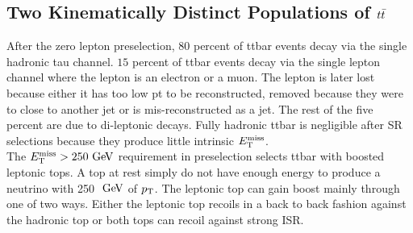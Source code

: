 \subsection{Two Kinematically Distinct Populations of $t\bar{t}$}
\label{sec:Bkg:ttbar:Pop}

\indent After the zero lepton preselection, 80 percent of ttbar events decay via the single hadronic tau channel.  $15$ percent of ttbar events decay via the single lepton channel where the lepton is an electron or a muon.  The lepton is later lost because either it has too low pt to be reconstructed, removed because they were to close to another jet or is mis-reconstructed as a jet. The rest of the five percent are due to di-leptonic decays. Fully hadronic ttbar is negligible after SR selections because they produce little intrinsic $E_{\mathrm{T}}^{\mathrm{miss}}$. \\

\indent  The $\met>250 \gev$ requirement in preselection selects ttbar with boosted leptonic tops.  A top at rest simply do not have enough energy to produce a neutrino with 250 $\gev$ of $p_{\mathrm{T}}$. The leptonic top can gain boost mainly through one of two ways.  Either the leptonic top recoils in a back to back fashion against the hadronic top or both tops can recoil against strong ISR.  \\



